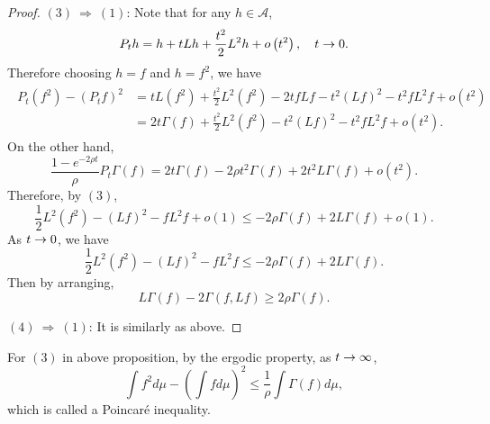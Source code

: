 \begin{proof}
    $(3)~\Rightarrow~(1)$: Note that for any $h \in \mathcal{A}$,
    \begin{equation*}
    	P_t h=h+t L h+\frac{t^2}{2} L^2 h+o\left(t^2\right),\quad t \rightarrow 0.
    \end{equation*}
    Therefore choosing $h = f$ and $h = f^2$, we have
    \begin{align*}
    	\begin{aligned}
			P_t\left(f^2\right)-\left(P_t f\right)^2 & =t L\left(f^2\right)+\frac{t^2}{2} L^2\left(f^2\right)-2 t f L f-t^2(L f)^2-t^2 f L^2 f+o\left(t^2\right) \\
			& =2 t \Gamma(f)+\frac{t^2}{2} L^2\left(f^2\right)-t^2(L f)^2-t^2 f L^2 f+o\left(t^2\right).
		\end{aligned}
    \end{align*}
    On the other hand,
    \begin{equation*}
    	\frac{1-e^{-2 \rho t}}{\rho} P_t \Gamma(f)=2 t \Gamma(f)-2 \rho t^2 \Gamma(f)+2 t^2 L \Gamma(f)+o\left(t^2\right).
    \end{equation*}
    Therefore, by $(3)$,
    \begin{equation*}
    	\frac{1}{2} L^2\left(f^2\right)-(L f)^2- f L^2 f+o(1) \leq -2 \rho \Gamma(f)+2 L \Gamma(f)+o(1).
    \end{equation*}
    As $t \rightarrow 0$, we have
    \begin{equation*}
    	\frac{1}{2} L^2\left(f^2\right)-(L f)^2- f L^2 f \leq -2 \rho \Gamma(f)+2 L \Gamma(f).
    \end{equation*}
    Then by arranging,
    \begin{equation*}
    	L \Gamma(f)-2 \Gamma(f, L f) \geq 2 \rho \Gamma(f).
    \end{equation*}

    $(4)~\Rightarrow~(1)$: It is similarly as above. \qedhere

\end{proof}

For $(3)$ in above proposition, by the ergodic property, as $t \rightarrow \infty$,
\begin{equation*}
	\int f^2 d \mu-\left(\int f d \mu\right)^2 \leq \frac{1}{\rho} \int \Gamma(f) d \mu,
\end{equation*}
which is called a Poincar\'e inequality.

